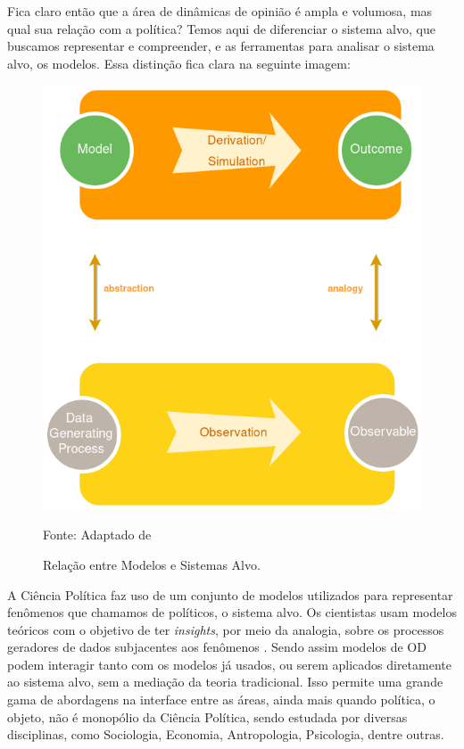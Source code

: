Fica claro então que a área de dinâmicas de opinião é ampla e volumosa, mas qual
sua relação com a política? Temos aqui de diferenciar o sistema alvo, que
buscamos representar e compreender, e as ferramentas para analisar o sistema
alvo, os modelos. Essa distinção fica clara na seguinte imagem:
\begin{figure}[H]
  \centering \includegraphics[scale = 0.5]{ims/ms.png}
  \caption{Relação entre Modelos e Sistemas Alvo.}
  Fonte: Adaptado de 
\end{figure}

A Ciência Política faz uso de um conjunto de modelos utilizados para representar
fenômenos que chamamos de políticos, o sistema alvo. Os cientistas usam modelos
teóricos com o objetivo de ter \textit{insights}, por meio da analogia, sobre os
processos geradores de dados subjacentes aos fenômenos
\cite{clarke2012model,morton1999methods}. Sendo assim modelos de OD podem
interagir tanto com os modelos já usados, ou serem aplicados diretamente ao
sistema alvo, sem a mediação da teoria tradicional. Isso permite uma grande gama
de abordagens na interface entre as áreas, ainda mais quando política, o objeto,
não é monopólio da Ciência Política, sendo estudada por diversas disciplinas,
como Sociologia, Economia, Antropologia, Psicologia, dentre outras.


